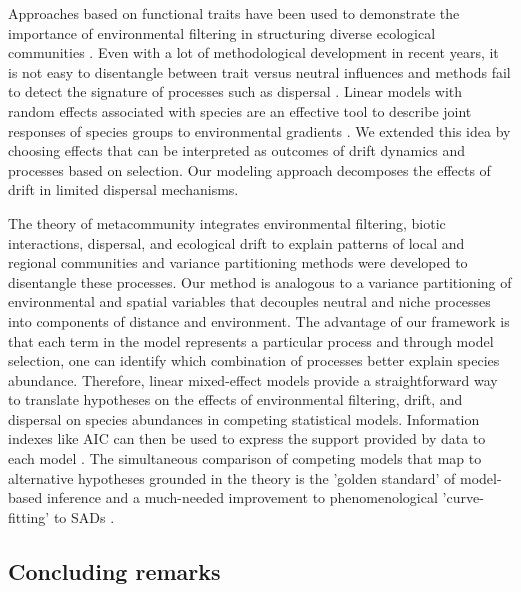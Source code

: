 \documentclass[12pt]{article}
\begin{document}
Approaches based on functional traits have been used to demonstrate
the importance of environmental filtering in structuring diverse
ecological communities \citep{lavorel2002predicting,
  Baraloto2012}. Even with a lot of methodological development in
recent years, it is not easy to disentangle between trait versus
neutral influences and methods fail to detect the signature of
processes such as dispersal \citep{kembel2009disentangling}.  Linear
models with random effects associated with species are an effective
tool to describe joint responses of species groups to environmental
gradients \citep{Jackson2012, Brown2014}. We extended this idea by
choosing effects that can be interpreted as outcomes of drift dynamics
and processes based on selection. Our modeling approach decomposes the
effects of drift in limited dispersal mechanisms.

The theory of metacommunity integrates environmental filtering, biotic
interactions, dispersal, and ecological drift to explain patterns of
local and regional communities \citep{leibold2017metacommunity,
  o2019metacommunity} and variance partitioning methods were developed
to disentangle these processes.  Our method is analogous to a variance
partitioning of environmental and spatial variables
\citep{Gilbert2004a} that decouples neutral and niche processes into
components of distance and environment. The advantage of our framework
is that each term in the model represents a particular process and
through model selection, one can identify which combination of
processes better explain species abundance. Therefore, linear
mixed-effect models provide a straightforward way to translate
hypotheses on the effects of environmental filtering, drift, and
dispersal on species abundances in competing statistical
models. Information indexes like AIC can then be used to express the
support provided by data to each model \citep{Burham2002,
  Johnson2004}. The simultaneous comparison of competing models that
map to alternative hypotheses grounded in the theory is the 'golden
standard' of model-based inference \citep{Hilborn1997} and a
much-needed improvement to phenomenological 'curve-fitting' to SADs
\citep{Mcgill2003}.


 \subsection*{Concluding remarks}
\end{document}
